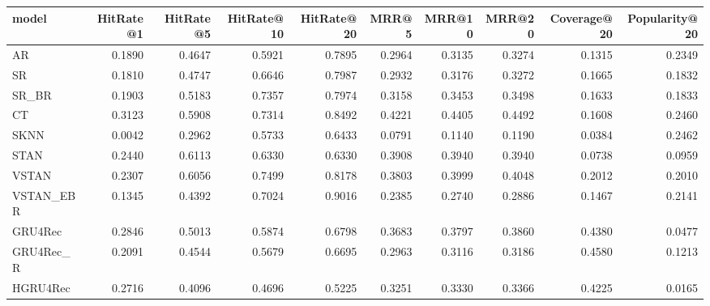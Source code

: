 \begin{tabular}{lrrrrrrrrr}
\toprule
     model &  HitRate@1 &  HitRate@5 &  HitRate@10 &  HitRate@20 &   MRR@5 &  MRR@10 &  MRR@20 &  Coverage@20 &  Popularity@20 \\
\midrule
        AR &     0.1890 &     0.4647 &      0.5921 &      0.7895 &  0.2964 &  0.3135 &  0.3274 &       0.1315 &         0.2349 \\
        SR &     0.1810 &     0.4747 &      0.6646 &      0.7987 &  0.2932 &  0.3176 &  0.3272 &       0.1665 &         0.1832 \\
     SR\_BR &     0.1903 &     0.5183 &      0.7357 &      0.7974 &  0.3158 &  0.3453 &  0.3498 &       0.1633 &         0.1833 \\
        CT &     0.3123 &     0.5908 &      0.7314 &      0.8492 &  0.4221 &  0.4405 &  0.4492 &       0.1608 &         0.2460 \\
      SKNN &     0.0042 &     0.2962 &      0.5733 &      0.6433 &  0.0791 &  0.1140 &  0.1190 &       0.0384 &         0.2462 \\
      STAN &     0.2440 &     0.6113 &      0.6330 &      0.6330 &  0.3908 &  0.3940 &  0.3940 &       0.0738 &         0.0959 \\
     VSTAN &     0.2307 &     0.6056 &      0.7499 &      0.8178 &  0.3803 &  0.3999 &  0.4048 &       0.2012 &         0.2010 \\
 VSTAN\_EBR &     0.1345 &     0.4392 &      0.7024 &      0.9016 &  0.2385 &  0.2740 &  0.2886 &       0.1467 &         0.2141 \\
   GRU4Rec &     0.2846 &     0.5013 &      0.5874 &      0.6798 &  0.3683 &  0.3797 &  0.3860 &       0.4380 &         0.0477 \\
 GRU4Rec\_R &     0.2091 &     0.4544 &      0.5679 &      0.6695 &  0.2963 &  0.3116 &  0.3186 &       0.4580 &         0.1213 \\
  HGRU4Rec &     0.2716 &     0.4096 &      0.4696 &      0.5225 &  0.3251 &  0.3330 &  0.3366 &       0.4225 &         0.0165 \\
\bottomrule
\end{tabular}
